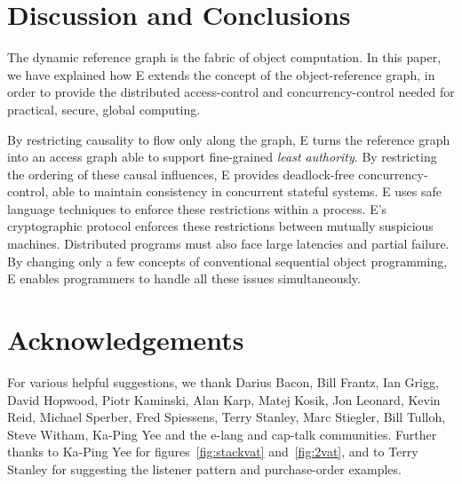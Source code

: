 \documentclass{llncs}
\begin{document}
\section{Discussion and Conclusions}

The dynamic reference graph is the fabric of object computation. In
this paper, we have explained how E extends the concept of the
object-reference graph, in order to provide the distributed
access-control and concurrency-control needed for practical, secure,
global computing.

By restricting causality to flow only along the graph, E turns the
reference graph into an access graph able to support fine-grained
\emph{least authority}. By restricting the ordering of these causal
influences, E provides deadlock-free concurrency-control, able to
maintain consistency in concurrent stateful systems.  E uses safe
language techniques to enforce these restrictions within a
process. E's cryptographic protocol enforces these restrictions
between mutually suspicious machines. Distributed programs must also
face large latencies and partial failure. By changing only a few
concepts of conventional sequential object programming, E enables
programmers to handle all these issues simultaneously.

\section{Acknowledgements}
For various helpful suggestions, we thank
Darius Bacon,
Bill Frantz,
Ian Grigg,
David Hopwood,
Piotr Kaminski,
Alan Karp,
Matej Kosik,
Jon Leonard,
Kevin Reid,
Michael Sperber,
Fred Spiessens,
Terry Stanley,
Marc Stiegler,
Bill Tulloh,
Steve Witham,
Ka-Ping Yee
and the e-lang and cap-talk communities. 
Further thanks to Ka-Ping Yee for figures~\ref{fig:stackvat}
and~\ref{fig:2vat}, 
and to Terry Stanley for suggesting the listener pattern
and purchase-order examples.


%

\end{document}
